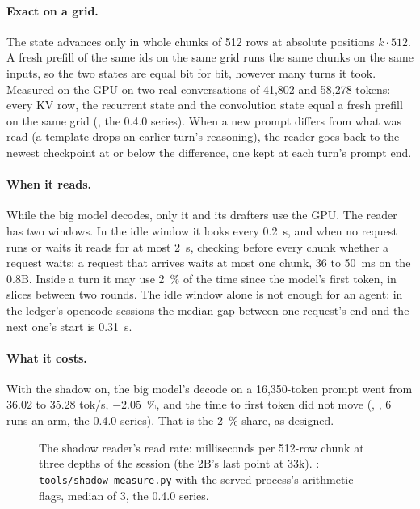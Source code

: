 \paragraph{Exact on a grid.} The state advances only in whole chunks of 512 rows at absolute positions $k \cdot 512$. A fresh prefill of the same ids on the same grid runs the same chunks on the same inputs, so the two states are equal bit for bit, however many turns it took. Measured on the GPU on two real conversations of 41,802 and 58,278 tokens: every KV row, the recurrent state and the convolution state equal a fresh prefill on the same grid (\measured, the 0.4.0 series). When a new prompt differs from what was read (a template drops an earlier turn's reasoning), the reader goes back to the newest checkpoint at or below the difference, one kept at each turn's prompt end.

\paragraph{When it reads.} While the big model decodes, only it and its drafters use the GPU. The reader has two windows. In the idle window it looks every 0.2~s, and when no request runs or waits it reads for at most 2~s, checking before every chunk whether a request waits; a request that arrives waits at most one chunk, 36 to 50~ms on the 0.8B. Inside a turn it may use 2~\% of the time since the model's first token, in slices between two rounds. The idle window alone is not enough for an agent: in the ledger's opencode sessions the median gap between one request's end and the next one's start is 0.31~s.

\paragraph{What it costs.} With the shadow on, the big model's decode on a 16,350-token prompt went from 36.02 to 35.28 tok/s, $-2.05$~\%, and the time to first token did not move (\measured, , 6 runs an arm, the 0.4.0 series). That is the 2~\% share, as designed.

\begin{figure}[htbp]
\centering
{}
\caption[The shadow reader's read rate]{The shadow reader's read rate: milliseconds per 512-row chunk at three depths of the session (the 2B's last point at 33k). \measured: \texttt{tools/shadow\_measure.py} with the served process's arithmetic flags, median of 3, the 0.4.0 series.}\label{fig:shadow-rate}
\end{figure}

